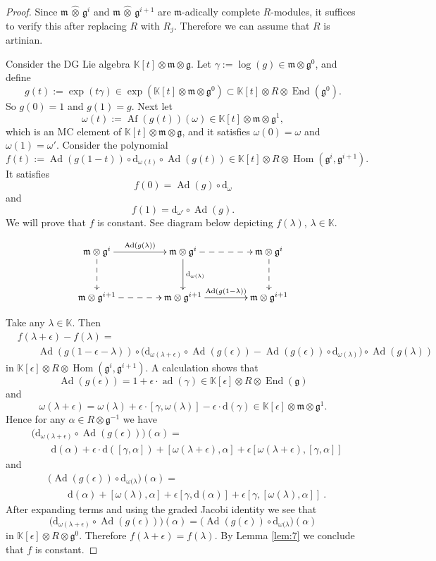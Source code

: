 \documentclass[a4paper,10pt]{amsart}
\theoremstyle{definition}
\numberwithin{equation}{section}
\newcommand{\opn}{\operatorname}
\newcommand{\mfrak}[1]{\mathfrak{#1}}
\newcommand{\mrm}[1]{\mathrm{#1}}
\newcommand{\mbb}[1]{\mathbb{#1}}
\newcommand{\what}[1]{\widehat{#1}}
\newcommand{\hatotimes}{\, \what{\otimes} \,}
\newcommand{\K}{\mbb{K}}
\newcommand{\g}{\mfrak{g}}
\newcommand{\m}{\mfrak{m}}
\renewcommand{\d}{\mrm{d}}
\newcommand{\om}{\omega}
\newcommand{\ep}{\epsilon}
\newcommand{\la}{\lambda}
\newcommand{\ga}{\gamma}
\newcommand{\al}{\alpha}
\begin{document}
\begin{proof}
Since $\m \hatotimes \g^{i}$ and $\m \hatotimes \g^{i+1}$ are
$\m$-adically complete $R$-modules, it suffices to verify this after replacing
$R$ with $R_j$. Therefore we can assume that $R$ is artinian.

Consider the DG Lie algebra 
$\K[t] \otimes \m \otimes \g$. 
Let $\ga := \log(g) \in \m \otimes \g^0$, and define 
\[ g(t) := \exp(t \ga) \in \exp(\K[t] \otimes \m \otimes \g^0)
\subset \K[t] \otimes R \otimes \opn{End}(\g^0) . \]
So $g(0) = 1$ and $g(1) = g$. Next let 
\[ \om(t) := \opn{Af}(g(t))(\om) \in \K[t] \otimes \m \otimes \g^1 , \]
which is an MC element of $\K[t] \otimes \m \otimes \g$, and it 
satisfies $\om(0) = \om$ and $\om(1) = \om'$. Consider the polynomial 
\[ f(t) := \opn{Ad}(g(1-t)) \circ \d_{\om(t)} \circ \opn{Ad}(g(t)) \in 
\K[t] \otimes R \otimes \opn{Hom}(\g^{i}, \g^{i+1}) . \]
It satisfies  
\[ f(0) = \opn{Ad}(g) \circ \d_{\om} \]
and 
\[ f(1) =  \d_{\om'} \circ \opn{Ad}(g)  . \]
We will prove that $f$ is constant.
See diagram below depicting $f(\la)$, $\la \in \K$.

\[ \UseTips \xymatrix @C=10ex @R=7ex {
\m \otimes \g^{i}
\ar[r]^{\opn{Ad}(g(\la))}
\ar@{-->}[d]
&
\m \otimes \g^{i}
\ar[d]^{\d_{\om(\la)}}
\ar@{-->}[r]
&
\m \otimes \g^{i}
\ar@{-->}[d]
\\
\m \otimes \g^{i+1}
\ar@{-->}[r]
&
\m \otimes \g^{i+1}
\ar[r]^{\opn{Ad}(g(1 - \la))}
&
\m \otimes \g^{i+1}
} \]

\medskip
Take any $\la \in \K$. Then 
\[ \begin{aligned}
& f(\la +\ep) - f(\la) = \\
& \qquad \opn{Ad}(g(1 - \ep - \la)) \circ
\bigl( \d_{\om(\la + \ep)} \circ \opn{Ad}(g(\ep)) -  
\opn{Ad}(g(\ep)) \circ \d_{\om(\la)} \bigr) \circ \opn{Ad}(g(\la)) 
\end{aligned} \]
in $\K[\ep] \otimes R \otimes \opn{Hom}(\g^{i}, \g^{i+1})$.
A calculation shows that 
\[ \opn{Ad}(g(\ep)) = 1 + \ep \cdot \opn{ad}(\ga) \in 
\K[\ep] \otimes R \otimes \opn{End}(\g) \]
and
\[ \om(\la + \ep) = \om(\la) + \ep \cdot [\ga, \om(\la)] - 
\ep \cdot \d(\ga) \in \K[\ep] \otimes \m \otimes \g^1 . \]
Hence for any 
$\al \in R \otimes \g^{-1}$ we have
\[ 
\begin{aligned}
& \bigl( \d_{\om(\la + \ep)} \circ \opn{Ad}(g(\ep)) \bigr)(\al) = \\
& \qquad \d(\al) + \ep \cdot \d([\ga, \al]) 
+ [\om(\la + \ep), \al] + \ep [ \om(\la + \ep), [\ga, \al]]
\end{aligned} \]
and 
\[ \begin{aligned}
& \bigl( \opn{Ad}(g(\ep)) \circ \d_{\om(\la} \bigr)(\al) = \\
& \qquad \d(\al) + [\om(\la), \al] + \ep [\ga, \d(\al)] +
\ep [\ga, [\om(\la), \al ]] \ .
\end{aligned} \]
After expanding terms and using the graded Jacobi identity we see that 
\[ \bigl( \d_{\om(\la + \ep)} \circ \opn{Ad}(g(\ep)) \bigr)(\al) =
\bigl( \opn{Ad}(g(\ep)) \circ \d_{\om(\la} \bigr)(\al) \]
in $\K[\ep] \otimes R \otimes \g^0$.
Therefore $f(\la +\ep) = f(\la)$. By Lemma \ref{lem:7} we conclude that 
$f$ is constant.
\end{proof}
\end{document}
